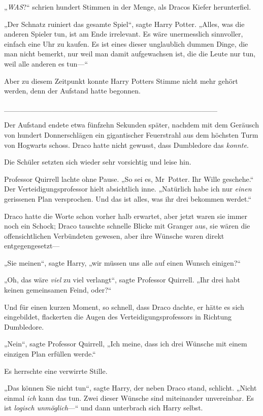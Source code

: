 {„\emph{WAS}?“ schrien hundert Stimmen in der Menge, als Dracos Kiefer herunterfiel.

„Der Schnatz ruiniert das gesamte Spiel“, sagte Harry Potter. „Alles, was die anderen Spieler tun, ist am Ende irrelevant. Es wäre unermesslich sinnvoller, einfach eine Uhr zu kaufen. Es ist eines dieser unglaublich dummen Dinge, die man nicht bemerkt, nur weil man damit aufgewachsen ist, die die Leute nur tun, weil alle anderen es tun—“

Aber zu diesem Zeitpunkt konnte Harry Potters Stimme nicht mehr gehört werden, denn der Aufstand hatte begonnen.

\_\_\_\_\_\_\_\_\_\_\_\_\_\_\_\_\_\_\_\_\_\_\_\_\_\_\_\_\_\_\_\_\_\_\_\_\_\_\_\_

Der Aufstand endete etwa fünfzehn Sekunden später, nachdem mit dem Geräusch von hundert Donnerschlägen ein gigantischer Feuerstrahl aus dem höchsten Turm von Hogwarts schoss. Draco hatte nicht gewusst, dass Dumbledore das \emph{konnte}.

Die Schüler setzten sich wieder sehr vorsichtig und leise hin.

Professor Quirrell lachte ohne Pause. „So sei es, Mr~Potter. Ihr Wille geschehe.“ Der Verteidigungsprofessor hielt absichtlich inne. „Natürlich habe ich nur \emph{einen} gerissenen Plan versprochen. Und das ist alles, was ihr drei bekommen werdet.“

Draco hatte die Worte schon vorher halb erwartet, aber jetzt waren sie immer noch ein Schock; Draco tauschte schnelle Blicke mit Granger aus, sie wären die offensichtlichen Verbündeten gewesen, aber ihre Wünsche waren direkt entgegengesetzt—

„Sie meinen“, sagte Harry, „wir müssen uns alle auf einen Wunsch einigen?“

„Oh, das wäre \emph{viel} zu viel verlangt“, sagte Professor Quirrell. „Ihr drei habt keinen gemeinsamen Feind, oder?“

Und für einen kurzen Moment, so schnell, dass Draco dachte, er hätte es sich eingebildet, flackerten die Augen des Verteidigungsprofessors in Richtung Dumbledore.

„Nein“, sagte Professor Quirrell, „Ich meine, dass ich drei Wünsche mit einem einzigen Plan erfüllen werde.“

Es herrschte eine verwirrte Stille.

„Das können Sie nicht tun“, sagte Harry, der neben Draco stand, schlicht. „Nicht einmal \emph{ich} kann das tun. Zwei dieser Wünsche sind miteinander unvereinbar. Es ist \emph{logisch unmöglich}—“ und dann unterbrach sich Harry selbst.

}
